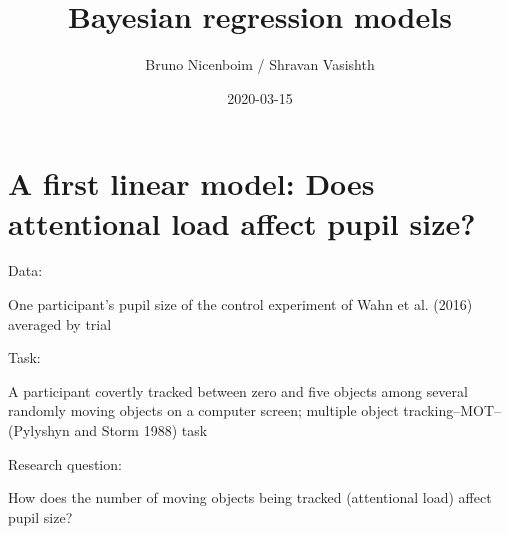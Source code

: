 \documentclass[12pt,ignorenonframetext,aspectratio=169]{beamer}
\title{Bayesian regression models}
\author{Bruno Nicenboim / Shravan Vasishth}
\date{2020-03-15}
\begin{document}
\frame{\titlepage}

\begin{frame}
\tableofcontents[hideallsubsections]
\end{frame}
\hypertarget{sec:pupil}{%
\section{A first linear model: Does attentional load affect pupil size?}\label{sec:pupil}}

\small

\normalsize

\begin{frame}

\begin{block}{Data:}

One participant's pupil size of the control experiment of Wahn et al. (2016) averaged by trial

\end{block}

\begin{block}{Task:}

A participant covertly tracked between zero and five objects among several randomly moving objects on a computer screen; multiple object tracking--MOT-- (Pylyshyn and Storm 1988) task

\end{block}

\begin{block}{Research question:}

How does the number of moving objects being tracked (attentional load) affect pupil size?

\end{block}

\end{frame}
\end{document}
